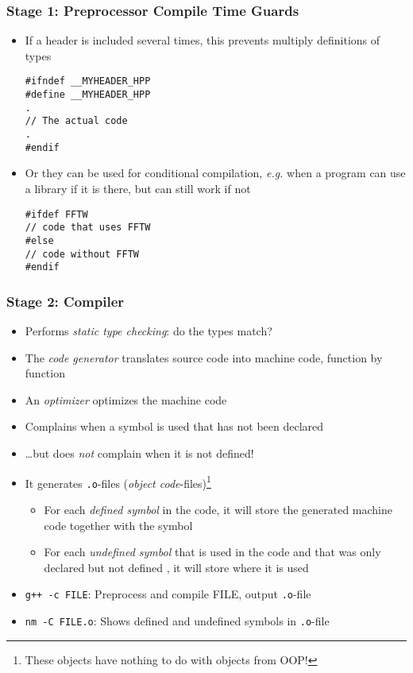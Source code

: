 \documentclass{slides}
\newcommand{\eg}{\textit{e.\thinspace g.}\xspace}
\begin{document}
\begin{frame}[fragile]
  \frametitle{Stage 1: Preprocessor Compile Time Guards}
    \begin{itemize}
    \item If a header is included several times, this prevents
      multiply definitions of types
      \begin{lstlisting}
#ifndef __MYHEADER_HPP
#define __MYHEADER_HPP
.
// The actual code
.
#endif          
      \end{lstlisting}
    \item Or they can be used for conditional compilation, \eg when a
      program can use a library if it is there, but can still work
      if not
      \begin{lstlisting}
#ifdef FFTW
// code that uses FFTW
#else
// code without FFTW
#endif        
      \end{lstlisting}
    \end{itemize}
\end{frame}

\begin{frame}[fragile]
  \frametitle{Stage 2: Compiler}

  \begin{itemize}
  \item Performs \emph{static type checking}: do the types match?
  \item The \emph{code generator} translates source code into machine
    code, function by function
  \item An \emph{optimizer} optimizes the machine code
  \item Complains when a symbol is used that has not been declared
  \item \dots but does \emph{not} complain when it is not defined!
  \item It generates \lstinline!.o!-files (\emph{object
      code}-files)\footnote{These objects have nothing to do with
      objects from OOP!}
    \begin{itemize}
    \item For each \emph{defined symbol} in the code, it will store
      the generated machine code together with the symbol
    \item For each \emph{undefined symbol} that is used in the code
      and that was only declared but not defined , it will store where
      it is used
    \end{itemize}
  \item \lstinline!g++ -c FILE!: Preprocess and compile FILE, output
    \lstinline!.o!-file
  \item \lstinline!nm -C FILE.o!: Shows defined and undefined symbols
    in \lstinline!.o!-file
  \end{itemize}
\end{frame}
\end{document}
